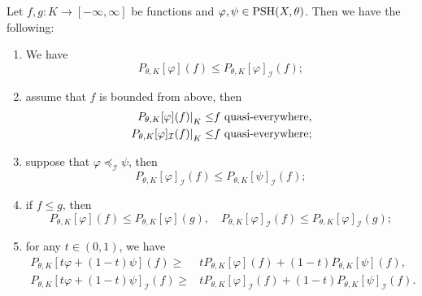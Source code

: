 \begin{proposition}\label{prop:partial_env}
    Let $f,g\colon K\rightarrow [-\infty,\infty]$ be functions and $\varphi,\psi\in \mathrm{PSH}(X,\theta)$. Then we have the following:
    \begin{enumerate}
        \item\label{itm:prop:partial_env:1} We have
        \[
        P_{\theta,K}[\varphi](f)\leq P_{\theta,K}[\varphi]_{\mathcal{I}}(f);
        \]
        \item\label{itm:prop:partial_env:2} assume that $f$ is bounded from above, then
        \[
        \begin{aligned}
            \left.P_{\theta,K}[\varphi](f)\right|_K\leq & f\textup{ quasi-everywhere},\\
             \left. P_{\theta,K}[\varphi]_{\mathcal{I}}(f)\right|_K\leq & f\textup{ quasi-everywhere};
        \end{aligned}
        \]
        \item\label{itm:prop:partial_env:3} suppose that $\varphi\preceq_{\mathcal{I}}\psi$, then
        \[
            P_{\theta,K}[\varphi]_{\mathcal{I}}(f)\leq P_{\theta,K}[\psi]_{\mathcal{I}}(f);
        \]
        \item\label{itm:prop:partial_env:4} if $f\leq g$, then
        \[
        P_{\theta,K}[\varphi](f)\leq P_{\theta,K}[\varphi](g),\quad P_{\theta,K}[\varphi]_{\mathcal{I}}(f)\leq P_{\theta,K}[\varphi]_{\mathcal{I}}(g);
        \]
        \item\label{itm:prop:partial_env:5} for any $t \in (0,1)$, we have
        \[
        \begin{aligned}
            P_{\theta,K}\left[t\varphi+(1-t)\psi\right](f)\geq & tP_{\theta,K}[\varphi](f)+(1-t)P_{\theta,K}[\psi](f),\\
            P_{\theta,K}\left[t\varphi+(1-t)\psi\right]_{\mathcal{I}}(f)\geq & tP_{\theta,K}[\varphi]_{\mathcal{I}}(f)+(1-t)P_{\theta,K}[\psi]_{\mathcal{I}}(f).
        \end{aligned}
        \]
    \end{enumerate}
\end{proposition}
